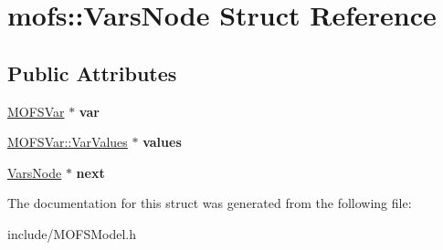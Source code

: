 \hypertarget{structmofs_1_1VarsNode}{\section{mofs\-:\-:Vars\-Node Struct Reference}
\label{structmofs_1_1VarsNode}
}
\subsection*{Public Attributes}
\begin{DoxyCompactItemize}
\item 
\hypertarget{structmofs_1_1VarsNode_a39535d838bc14fb31992afcd2ad66e68}{\hyperlink{classMOFSVar}{M\-O\-F\-S\-Var} $\ast$ {\bfseries var}}\label{structmofs_1_1VarsNode_a39535d838bc14fb31992afcd2ad66e68}

\item 
\hypertarget{structmofs_1_1VarsNode_a169c3114e7de00d16c34b483255ed0ba}{\hyperlink{structMOFSVar_1_1VarValues}{M\-O\-F\-S\-Var\-::\-Var\-Values} $\ast$ {\bfseries values}}\label{structmofs_1_1VarsNode_a169c3114e7de00d16c34b483255ed0ba}

\item 
\hypertarget{structmofs_1_1VarsNode_a1bf741f0be28b21a3085db58471efe0f}{\hyperlink{structmofs_1_1VarsNode}{Vars\-Node} $\ast$ {\bfseries next}}\label{structmofs_1_1VarsNode_a1bf741f0be28b21a3085db58471efe0f}

\end{DoxyCompactItemize}


The documentation for this struct was generated from the following file\-:\begin{DoxyCompactItemize}
\item 
include/M\-O\-F\-S\-Model.\-h\end{DoxyCompactItemize}
